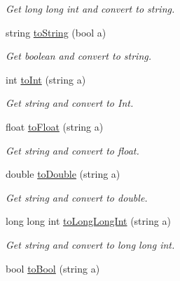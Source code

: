 \begin{DoxyCompactItemize}
\begin{DoxyCompactList}\small\item\em Get long long int and convert to string. \end{DoxyCompactList}\item 
\hypertarget{namespacecommon_ad4970622daef780374effb8e47cf8134}{string \hyperlink{namespacecommon_ad4970622daef780374effb8e47cf8134}{to\-String} (bool a)}\label{namespacecommon_ad4970622daef780374effb8e47cf8134}

\begin{DoxyCompactList}\small\item\em Get boolean and convert to string. \end{DoxyCompactList}\item 
\hypertarget{namespacecommon_a31cd86456425bdd976cc622c5828e17f}{int \hyperlink{namespacecommon_a31cd86456425bdd976cc622c5828e17f}{to\-Int} (string a)}\label{namespacecommon_a31cd86456425bdd976cc622c5828e17f}

\begin{DoxyCompactList}\small\item\em Get string and convert to Int. \end{DoxyCompactList}\item 
\hypertarget{namespacecommon_affd5ec1cd7889f6e63c8fde2c1db389d}{float \hyperlink{namespacecommon_affd5ec1cd7889f6e63c8fde2c1db389d}{to\-Float} (string a)}\label{namespacecommon_affd5ec1cd7889f6e63c8fde2c1db389d}

\begin{DoxyCompactList}\small\item\em Get string and convert to float. \end{DoxyCompactList}\item 
\hypertarget{namespacecommon_adeca0735c7b49feb339967ada8cde286}{double \hyperlink{namespacecommon_adeca0735c7b49feb339967ada8cde286}{to\-Double} (string a)}\label{namespacecommon_adeca0735c7b49feb339967ada8cde286}

\begin{DoxyCompactList}\small\item\em Get string and convert to double. \end{DoxyCompactList}\item 
\hypertarget{namespacecommon_a9f91668221fb6afe69e9f8f517a4fe7c}{long long int \hyperlink{namespacecommon_a9f91668221fb6afe69e9f8f517a4fe7c}{to\-Long\-Long\-Int} (string a)}\label{namespacecommon_a9f91668221fb6afe69e9f8f517a4fe7c}

\begin{DoxyCompactList}\small\item\em Get string and convert to long long int. \end{DoxyCompactList}\item 
\hypertarget{namespacecommon_aed690e352783334b551a1c74947cb101}{bool \hyperlink{namespacecommon_aed690e352783334b551a1c74947cb101}{to\-Bool} (string a)}\label{namespacecommon_aed690e352783334b551a1c74947cb101}


\end{DoxyCompactItemize}
